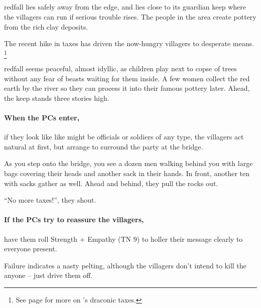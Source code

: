 
\subsection{}
\label{redfallVillage}

\Gls{redfall} lies safely away from the \gls{edge}, and lies close to its guardian keep where the villagers can run if serious trouble rises.
The people in the area create pottery from the rich clay deposits.

The recent hike in taxes has driven the now-hungry villagers to desperate means.%
\footnote{See page \pageref{desperatemeasures} for more on 's draconic taxes.}

\begin{boxtext}
  \Gls{redfall} seems peaceful, almost idyllic, as children play next to copse of trees without any fear of beasts waiting for them inside.
  A few women collect the red earth by the river so they can process it into their famous pottery later.
  Ahead, the keep stands three stories high.
\end{boxtext}

\paragraph{When the PCs enter,}
if they look like like might be officials or soldiers of any type, the villagers act natural at first, but arrange to surround the party at the bridge.

\begin{boxtext}

  As you step onto the bridge, you see a dozen men walking behind you with large bags covering their heads and another sack in their hands.
  In front, another ten with sacks gather as well.
  Ahead and behind, they pull the rocks out.

  ``No more taxes!'', they shout.

\end{boxtext}

\paragraph{If the PCs try to reassure the villagers,}
have them roll Strength + Empathy (TN 9) to holler their message clearly to everyone present.

Failure indicates a nasty pelting, although the villagers don't intend to kill the anyone -- just drive them off.

